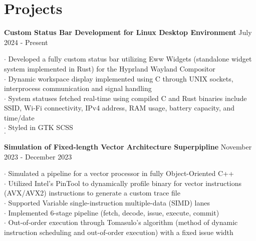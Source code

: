 \documentclass[letter,12pt]{article}
\begin{document}
\section*{Projects} 
\vspace{-.25cm}
\begin{tcolorbox}
[colback=gray!25,
  leftrule=0pt,
  rightrule=0pt,
  sharp corners]
\textbf{Custom Status Bar Development for Linux Desktop Environment}
\hfill July 2024 - Present
\end{tcolorbox}
\noindent
$\cdot$ Developed a fully custom status bar utilizing Eww Widgets 
(standalone widget system implemented in Rust) for the Hyprland Wayland 
Compositor\\
$\cdot$ Dynamic workspace display implemented using C through UNIX sockets, interprocess 
communication and signal handling\\
$\cdot$ System statuses fetched real-time using compiled C and Rust binaries include
SSID, Wi-Fi connectivity, IPv4 address, RAM usage, battery capacity, and time/date\\
$\cdot$ Styled in GTK SCSS \\
$\cdot$ \href{https://github.com/DMGDy/eww-bar}
{}

\vspace{-.125cm}
\begin{tcolorbox}
[colback=gray!25,
  leftrule=0pt,
  rightrule=0pt,
  sharp corners]
\noindent\textbf{Simulation of Fixed-length Vector Architecture Superpipline}
\hfill November 2023 - December 2023
\end{tcolorbox}
\noindent
$\cdot$ Simulated a pipeline for a vector processor in fully Object-Oriented C++\\
$\cdot$ Utilized Intel's PinTool to dynamically profile binary for vector instructions (AVX/AVX2) instructions to generate a custom trace file\\
$\cdot$ Supported Variable single-instruction multiple-data (SIMD) lanes\\
$\cdot$ Implemented 6-stage pipeline (fetch, decode, issue, execute, commit)\\
$\cdot$ Out-of-order execution through Tomasulo's algorithm (method of dynamic
instruction scheduling and out-of-order execution)
with a fixed issue width\\
\end{document}

